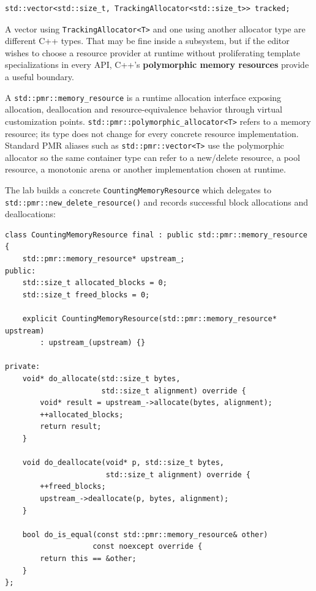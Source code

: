 \begin{verbatim}
std::vector<std::size_t, TrackingAllocator<std::size_t>> tracked;
\end{verbatim}

A vector using \texttt{TrackingAllocator\textless{}T\textgreater{}} and one using another allocator type are different C++ types. That may be fine inside a subsystem, but if the editor wishes to choose a resource provider at runtime without proliferating template specializations in every API, C++'s \textbf{polymorphic memory resources} provide a useful boundary.

A \texttt{std::pmr::memory\_resource} is a runtime allocation interface exposing allocation, deallocation and resource-equivalence behavior through virtual customization points. \texttt{std::pmr::polymorphic\_allocator\textless{}T\textgreater{}} refers to a memory resource; its type does not change for every concrete resource implementation. Standard PMR aliases such as \texttt{std::pmr::vector\textless{}T\textgreater{}} use the polymorphic allocator so the same container type can refer to a new/delete resource, a pool resource, a monotonic arena or another implementation chosen at runtime.

The lab builds a concrete \texttt{CountingMemoryResource} which delegates to \texttt{std::pmr::new\_delete\_resource()} and records successful block allocations and deallocations:

\begin{verbatim}
class CountingMemoryResource final : public std::pmr::memory_resource {
    std::pmr::memory_resource* upstream_;
public:
    std::size_t allocated_blocks = 0;
    std::size_t freed_blocks = 0;

    explicit CountingMemoryResource(std::pmr::memory_resource* upstream)
        : upstream_(upstream) {}

private:
    void* do_allocate(std::size_t bytes,
                      std::size_t alignment) override {
        void* result = upstream_->allocate(bytes, alignment);
        ++allocated_blocks;
        return result;
    }

    void do_deallocate(void* p, std::size_t bytes,
                       std::size_t alignment) override {
        ++freed_blocks;
        upstream_->deallocate(p, bytes, alignment);
    }

    bool do_is_equal(const std::pmr::memory_resource& other)
                    const noexcept override {
        return this == &other;
    }
};
\end{verbatim}

